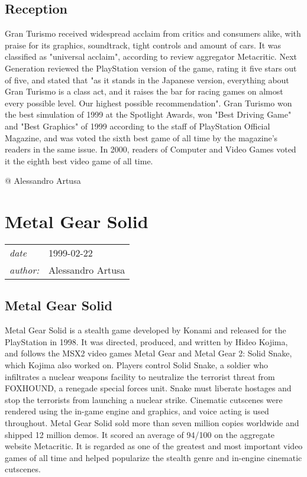 \documentclass[a4paper,10pt]{book}
\newcommand{\pageHeader}[4]{
    \section{#1}
    \vspace{-0.3cm}
    \begin{table}[h!]
     \begin{tabular}{ll}
        \hline
        \textit{date} & #2 \\
        \textit{author: } & #3\\
        \hline
     \end{tabular}
    \end{table}
    \vspace{-0.3cm}
}
\begin{document}
 \subsection{Reception }
 
          Gran Turismo received widespread acclaim from critics and consumers alike, with praise for its graphics, soundtrack, tight controls and amount of cars. It was classified as "universal acclaim", according to review aggregator Metacritic. 
          Next Generation reviewed the PlayStation version of the game, rating it five stars out of five, and stated that "as it stands in the Japanese version, everything about Gran Turismo is a class act, and it raises the bar for racing games on almost every possible level. Our highest possible recommendation". 
          Gran Turismo won the best simulation of 1999 at the Spotlight Awards, won "Best Driving Game" and "Best Graphics" of 1999 according to the staff of PlayStation Official Magazine, and was voted the sixth best game of all time by the magazine's readers in the same issue. In 2000, readers of Computer and Video Games voted it the eighth best video game of all time.
         
 
 @ Alessandro Artusa 
 
 \newpage\pageHeader{Metal Gear Solid}{1999-02-22}{Alessandro Artusa}{The page of Metal Gear Solid, the acclaimed stealth game by Hideo Kojima}
 \subsection{Metal Gear Solid }
 
          Metal Gear Solid is a stealth game developed by Konami and released for the PlayStation in 1998. It was directed, produced, and written by Hideo Kojima, and follows the MSX2 video games Metal Gear and Metal Gear 2: Solid Snake, which Kojima also worked on. 
          Players control Solid Snake, a soldier who infiltrates a nuclear weapons facility to neutralize the terrorist threat from FOXHOUND, a renegade special forces unit. Snake must liberate hostages and stop the terrorists from launching a nuclear strike. Cinematic cutscenes were rendered using the in-game engine and graphics, and voice acting is used throughout. 
          Metal Gear Solid sold more than seven million copies worldwide and shipped 12 million demos. It scored an average of 94/100 on the aggregate website Metacritic. It is regarded as one of the greatest and most important video games of all time and helped popularize the stealth genre and in-engine cinematic cutscenes.
         
\end{document}

